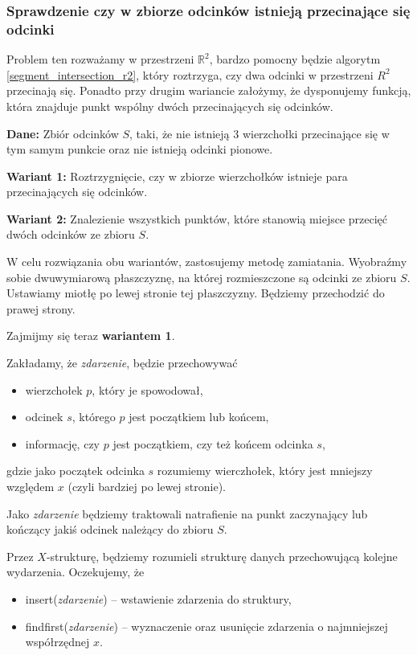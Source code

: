 \subsubsection{Sprawdzenie czy w zbiorze odcinków istnieją przecinające się odcinki}
Problem ten rozważamy w przestrzeni $\mathbb{R}^2$, bardzo pomocny będzie 
algorytm \ref{segment_intersection_r2}, który roztrzyga, czy dwa odcinki
w przestrzeni $R^2$ przecinają się. Ponadto przy drugim wariancie założymy,
że dysponujemy funkcją, która znajduje punkt wspólny dwóch 
przecinających się odcinków. 

\textbf{Dane:} Zbiór odcinków $S$, taki, że nie istnieją 3 wierzchołki przecinające
się w tym samym punkcie oraz nie istnieją odcinki pionowe.

\textbf{Wariant 1:} Roztrzygnięcie, czy w zbiorze wierzchołków istnieje 
para przecinających się odcinków.

\textbf{Wariant 2:} Znalezienie wszystkich punktów, które 
stanowią miejsce przecięć dwóch odcinków ze zbioru $S$.

W celu rozwiązania obu wariantów, zastosujemy metodę zamiatania. Wyobraźmy
sobie dwuwymiarową płaszczyznę, na której rozmieszczone są odcinki ze zbioru $S$.
Ustawiamy miotłę po lewej stronie tej płaszczyzny. Będziemy przechodzić do prawej strony.

Zajmijmy się teraz \textbf{wariantem 1}.

Zakładamy, że \textit{zdarzenie}, będzie przechowywać 
\begin{itemize}
	\item wierzchołek $p$, który je spowodował, 
	\item odcinek $s$, którego $p$ jest początkiem lub końcem,
	\item informację, czy $p$ jest początkiem, czy też końcem odcinka $s$,
\end{itemize}
gdzie jako początek odcinka $s$ rozumiemy wierczhołek, który jest 
mniejszy względem $x$ (czyli bardziej po lewej stronie).

Jako \textit{zdarzenie} będziemy traktowali natrafienie na punkt zaczynający 
lub kończący jakiś odcinek należący do zbioru $S$.

Przez $X$-strukturę, będziemy rozumieli strukturę danych przechowującą 
kolejne wydarzenia. Oczekujemy, że 
\begin{itemize}
	\item insert(\textit{zdarzenie})  -- wstawienie zdarzenia do struktury,
	\item findfirst(\textit{zdarzenie})  -- wyznaczenie oraz usunięcie zdarzenia
	o najmniejszej współrzędnej $x$.
\end{itemize}

